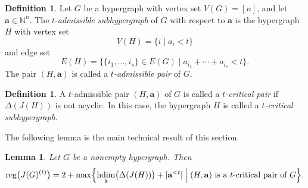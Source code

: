 \documentclass[12pt,amscd]{amsart}
\newtheorem{lem}[thm]{Lemma}
\theoremstyle{definition}
\newtheorem{defn}[thm]{Definition}
\DeclareMathOperator{\hdim}{hdim}
\DeclareMathOperator{\reg}{reg}
\def\a {\mathbf a}
\def\k {\mathrm k}
\begin{document}
\begin{defn}
Let $G$ be a hypergraph with vertex set $V(G) = [n]$, and let $\a \in \mathbb{N}^n$. The $t$-\emph{admissible subhypergraph} of $G$ with respect to $\a$ is the hypergraph $H$ with vertex set
\[
V(H) = \{i \mid a_i < t\}
\]
and edge set
\[
E(H)
=
\bigl\{
\{i_1, \ldots, i_s\} \in E(G)
\;\big|\;
a_{i_1} + \cdots + a_{i_s} < t
\bigr\}.
\]
The pair $(H,\a)$ is called a \emph{$t$-admissible pair} of $G$.
\end{defn}

\begin{defn}
A $t$-admissible pair $(H,\a)$ of $G$ is called a \emph{$t$-critical pair} if $\Delta(J(H))$ is not acyclic. In this case, the hypergraph $H$ is called a \emph{$t$-critical subhypergraph}.
\end{defn}

The following lemma is the main technical result of this section.

\begin{lem}\label{lem_reg_admissible}
Let $G$ be a nonempty hypergraph. Then
\begin{multline*}
\reg\bigl(J(G)^{(t)}\bigr)
=
2 + \max \Bigl\{
\hdim_{\k}\bigl(\Delta(J(H))\bigr) + |\a^{<t}|
\;\Big|\;
(H,\a) \text{ is a $t$-critical pair of } G
\Bigr\}.
\end{multline*}
\end{lem}
\end{document}
